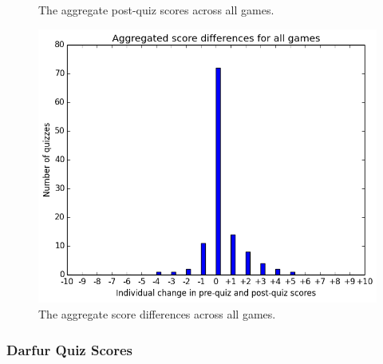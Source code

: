 \begin{figure}[h]
\begin{minipage}[b]{0.45\linewidth}
			\caption{The aggregate post-quiz scores across all games.}
			\end{minipage}
			\end{figure}

			\begin{figure}[h] 
			\centering 
			\includegraphics[height=0.33\textheight]{general_results.png} 
			\caption{The aggregate score differences across all games.}
			\end{figure}

	\cleardoublepage

		\subsubsection{Darfur Quiz Scores}


